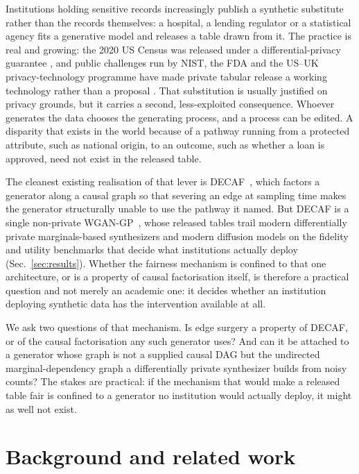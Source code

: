 \documentclass[manuscript,screen,review]{acmart}
\begin{document}
Institutions holding sensitive records increasingly publish a synthetic
substitute rather than the records themselves: a hospital, a lending regulator
or a statistical agency fits a generative model and releases a table drawn from
it. The practice is real and growing: the 2020 US Census was released under a
differential-privacy guarantee \citep{abowd2022topdown}, and public challenges
run by NIST, the FDA and the US--UK privacy-technology programme have made
private tabular release a working technology rather than a proposal
\citep{nist2018challenge,vchamps2023,vos2024}. That substitution is usually justified on privacy grounds, but it carries a
second, less-exploited consequence. Whoever generates the data chooses the
generating process, and a process can be edited. A disparity that exists in the
world because of a pathway running from a protected attribute, such as national
origin, to an outcome, such as whether a loan is approved, need not exist in
the released table.

The cleanest existing realisation of that lever is
DECAF~\citep{vanbreugel2021decaf}, which factors a generator along a causal
graph so that severing an edge at sampling time makes the generator
structurally unable to use the pathway it named. But DECAF is a single
non-private WGAN-GP~\citep{gulrajani2017wgangp}, whose released tables trail
modern differentially private marginals-based synthesizers and modern
diffusion models on the fidelity and utility benchmarks that decide what
institutions actually deploy (Sec.~\ref{sec:results}). Whether the fairness mechanism is confined to
that one architecture, or is a property of causal factorisation itself, is
therefore a practical question and not merely an academic one: it decides whether an
institution deploying synthetic data has the intervention available at all.

We ask two questions of that mechanism. Is edge surgery a property of DECAF,
or of the causal factorisation any such generator uses? And can it be attached
to a generator whose graph is not a supplied causal DAG but the undirected
marginal-dependency graph a differentially private synthesizer builds from
noisy counts? The stakes are practical: if the mechanism that would make a
released table fair is confined to a generator no institution would actually
deploy, it might as well not exist.

\section{Background and related work}
\label{sec:related}
\end{document}
